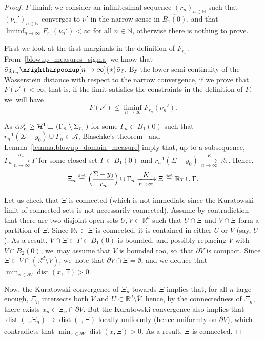 \documentclass[10pt]{amsart}
\let\ts\textstyle
\theoremstyle{definition}
\newcommand{\eqdef}{\ensuremath{\stackrel{\mbox{\upshape\tiny def.}}{=}}}
\newcommand\LM[1]{\hbox{\vrule width.5pt \vbox to#1pt{\vfill \hrule width#1pt height.5pt}}}
\newcommand\LL{{\mathchoice {\>\LM7\>}{\>\LM7\>}{\,\LM5\,}{\,\LM{3.35}\,}}}
\newcommand{\mres}{\LL}
\newcommand\cH{\mathcal{H}}
\newcommand{\RR}{\mathbb{R}}
\DeclareMathOperator{\dist}{dist}
\newcommand{\distH}{d_{\mathcal{H}}}
\begin{document}
\begin{proof}

$\Gamma$-liminf: we consider an infinitesimal sequence $(r_n)_{n \in \mathbb{N}}$ such that ${(\nu_{n}')}_{n \in \mathbb{N}}$ converges to $\nu'$ in the narrow
sense in $\overline{B_1(0)}$, and that $\liminf_{n \to \infty} F_{r_n}(\nu_n') < \infty$ for all $n \in \mathbb{N}$, otherwise there is nothing to prove.

First we look at the first marginals in the definition of $F_{r_n}$. From~\eqref{blowup_measures_sigma} we know that $\bar \sigma_{\delta, r_n}\xrightharpoonup[n \to \infty]{\star} \bar\sigma_{\delta}$.
By the lower semi-continuity of the Wasserstein distance with respect to the narrow convergence,
if we prove that $F(\nu') < \infty$, that is, if the limit satisfies the constraints in the definition of $F$, we~will have
\[
F(\nu') \le \liminf_{n \to \infty} F_{r_n}(\nu_n').
\]

As $\alpha \nu_n' \ge \cH^1\mres \left(\Gamma_{n}\setminus\Sigma_{r_n}\right)$ for some $\Gamma_n \subset \overline{B_1(0)}$ such that $r_n^{-1}(\Sigma-y_0)\cup \Gamma_n \in \mathcal{A}$, Blaschke's theorem~\cite[Th.\,6.1]{ambrosio2000functions}
and Lemma~\ref{lemma.blowup_domain_measure} imply that, up to a subsequence, $\Gamma_n \xrightarrow[n \to \infty]{\distH} \Gamma$ for some closed set $\Gamma \subset \overline{ B_1(0)}$ and $r_n^{-1}(\Sigma-y_0)\,{\xrightarrow[n \to \infty]{K}}\, \RR\tau$. Hence,
\[
\Xi_n
\eqdef
\Bigl(
\frac{\Sigma - y_0}{r_n}
\Bigr)
\cup \Gamma_n
\xrightarrow[n \to \infty]{\ts K}
\Xi
\eqdef
\RR\tau \cup \Gamma.
\]

Let us check that $\Xi$ is connected (which is not immediate since the Kuratowski limit of connected sets is not necessarily connected).
Assume by contradiction that there are two disjoint open sets $U,V \subset \RR^d$ such that $U\cap \Xi$ and $V\cap \Xi$ form a partition of $\Xi$. Since $\RR\tau \subset \Xi$ is connected, it is contained in either $U$ or $V$ (say, $U$). As a result, $V\cap \Xi\subset \Gamma \subset \overline{B_1(0)}$ is bounded, and possibly replacing $V$ with $V\cap B_2(0)$, we~may assume that $V$ is bounded too, so~that $\partial V$ is compact.
Since $\Xi\subset V\cap (\RR^d\setminus \overline{V})$, we~note that $\partial V \cap \Xi=\emptyset$, and we deduce that $\min_{x\in \partial V} \dist(x,\Xi)>0$.

Now, the Kuratowski convergence of $\Xi_n$ towards $\Xi$ implies that, for all $n$ large enough, $\Xi_n$ intersects both $V$ and $U\subset \RR^d\setminus \overline{V}$, hence, by the connectedness of $\Xi_n$, there exists $x_n\in \Xi_n \cap \partial V$.
But the Kuratowski convergence also implies that $\dist(\cdot,\Xi_n) \xrightarrow[]{} \dist(\cdot,\Xi)$ locally uniformly (hence uniformly on $\partial V$), which contradicts that $\min_{x\in \partial V} \dist(x,\Xi)>0$. As a result, $\Xi$ is connected.


\end{proof}
\end{document}
